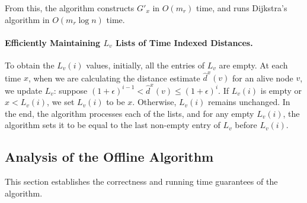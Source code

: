 From this, the algorithm constructs $G'_x$ in $O(m_r)$ time, and runs Dijkstra's algorithm in $O(m_r\log n)$ time. 

\paragraph{Efficiently Maintaining $L_v$ Lists of Time Indexed Distances.}
To obtain the $L_v(i)$ values, initially, all the entries of $L_v$ are empty. 
At each time $x$, when we are calculating the distance estimate $\hat{d}^x(v)$ for an alive node $v$, we update $L_v$: suppose $(1+\epsilon)^{i-1} < \hat{d}^x(v) \leq (1+\epsilon)^{i}$.
If $L_v(i)$ is empty or $x<L_v(i)$, we set $L_v(i)$ to be $x$. Otherwise, $L_v(i)$ remains unchanged. In the end, the algorithm processes each of the lists, and for any empty $L_v(i)$, the algorithm sets it to be equal to the last non-empty entry of $L_v$ before $L_v(i)$.

\subsection{Analysis of the Offline Algorithm}
\label{sec:offline_analysis}

This section establishes the correctness and running time guarantees of the algorithm.   

